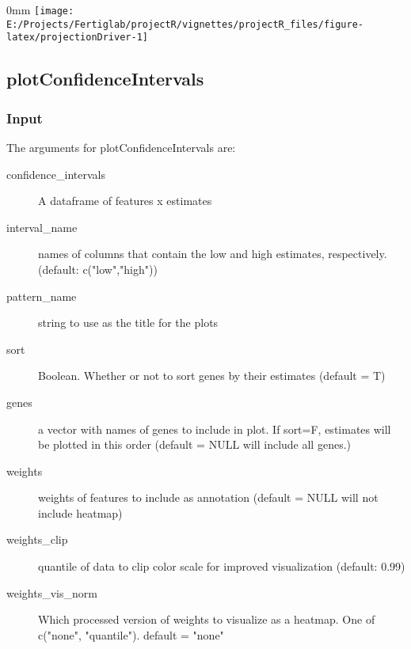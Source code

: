 \documentclass[]{article}
\newcommand{\hlstr}[1]{\textcolor[rgb]{0.251,0.627,0.251}{#1}}%
\newcommand{\hlcom}[1]{\textcolor[rgb]{0.502,0.502,0.502}{\textit{#1}}}%
\newcommand{\hlopt}[1]{\textcolor[rgb]{0,0,0}{#1}}%
\newcommand{\hlstd}[1]{\textcolor[rgb]{0.251,0.251,0.251}{#1}}%
\newcommand{\hlkwd}[1]{\textcolor[rgb]{0.878,0.439,0.125}{#1}}%
\newenvironment{Shaded}{\begin{myshaded}}{\end{myshaded}}
\newcommand{\KeywordTok}[1]{\hlkwd{#1}}
\newcommand{\StringTok}[1]{\hlstr{#1}}
\newcommand{\CommentTok}[1]{\hlcom{#1}}
\newcommand{\OperatorTok}[1]{\hlopt{#1}}
\newcommand{\NormalTok}[1]{\hlstd{#1}}
\begin{document}
\begin{adjustwidth}{\fltoffset}{0mm}
\texttt{[image: E:/Projects/Fertiglab/projectR/vignettes/projectR\_files/figure-latex/projectionDriver-1]} \end{adjustwidth}

\begin{Shaded}
\end{Shaded}

\hypertarget{plotconfidenceintervals}{%
\subsection{plotConfidenceIntervals}\label{plotconfidenceintervals}}

\hypertarget{input}{%
\subsubsection{Input}\label{input}}

The arguments for plotConfidenceIntervals are:

\begin{description}
\item[confidence\_intervals]{A dataframe of features x estimates}
\item[interval\_name]{names of columns that contain the low and high estimates, respectively.
(default: c("low","high"))}
\item[pattern\_name]{string to use as the title for the plots}
\item[sort]{Boolean. Whether or not to sort genes by their estimates (default = T)}
\item[genes]{a vector with names of genes to include in plot. If sort=F, estimates will be plotted in this order (default = NULL will include all genes.)}
\item[weights]{weights of features to include as annotation (default = NULL will not include heatmap)}
\item[weights\_clip]{quantile of data to clip color scale for improved visualization (default: 0.99)}
\item[weights\_vis\_norm]{Which processed version of weights to visualize as a heatmap. One of c("none", "quantile"). default = "none"}
\end{description}
\end{document}
